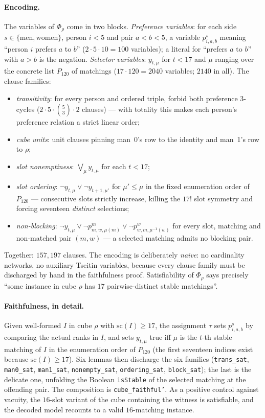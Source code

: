 \documentclass[11pt]{article}
\begin{document}
\paragraph{Encoding.} The variables of $\Phi_\rho$ come in two blocks. \emph{Preference
variables}: for each side $s\in\{\text{men},\text{women}\}$, person $i<5$ and pair
$a<b<5$, a variable $p^s_{i,a,b}$ meaning ``person $i$ prefers $a$ to $b$''
($2\cdot5\cdot10=100$ variables); a literal for ``prefers $a$ to $b$'' with $a>b$ is the
negation. \emph{Selector variables}: $y_{t,\mu}$ for $t<17$ and $\mu$ ranging over the
concrete list $P_{120}$ of matchings ($17\cdot120=2040$ variables; $2140$ in all). The
clause families:
\begin{itemize}
\item \emph{transitivity}: for every person and ordered triple, forbid both preference
  $3$-cycles ($2\cdot 5\cdot\binom{5}{3}\cdot 2$ clauses) --- with totality this makes each
  person's preference relation a strict linear order;
\item \emph{cube units}: unit clauses pinning man~0's row to the identity and man~1's row
  to $\rho$;
\item \emph{slot nonemptiness}: $\bigvee_\mu y_{t,\mu}$ for each $t<17$;
\item \emph{slot ordering}: $\neg y_{t,\mu} \vee \neg y_{t+1,\mu'}$ for $\mu' \le \mu$ in
  the fixed enumeration order of $P_{120}$ --- consecutive slots strictly increase, killing
  the $17!$ slot symmetry and forcing seventeen \emph{distinct} selections;
\item \emph{non-blocking}: $\neg y_{t,\mu} \vee \neg p^m_{m,w,\mu(m)} \vee
  \neg p^w_{w,m,\mu^{-1}(w)}$ for every slot, matching and non-matched pair $(m,w)$ ---
  a selected matching admits no blocking pair.
\end{itemize}
Together: $157{,}197$ clauses. The encoding is deliberately \emph{naive}: no cardinality
networks, no auxiliary Tseitin variables, because every clause family must be discharged by
hand in the faithfulness proof. Satisfiability of $\Phi_\rho$ says precisely ``some
instance in cube $\rho$ has $17$ pairwise-distinct stable matchings''.

\paragraph{Faithfulness, in detail.} Given well-formed $I$ in cube $\rho$ with
$\mathrm{sc}(I)\ge 17$, the assignment $\tau$ sets $p^s_{i,a,b}$ by comparing the actual
ranks in $I$, and sets $y_{t,\mu}$ true iff $\mu$ is the $t$-th stable matching of $I$ in
the enumeration order of $P_{120}$ (the first seventeen indices exist because
$\mathrm{sc}(I)\ge 17$). Six lemmas then discharge the six families
(\texttt{trans\_sat}, \texttt{man0\_sat}, \texttt{man1\_sat}, \texttt{nonempty\_sat},
\texttt{ordering\_sat}, \texttt{block\_sat}); the last is the delicate one, unfolding the
Boolean \texttt{isStable} of the selected matching at the offending pair. The composition
is \texttt{cube\_faithful'}. As a positive control against vacuity, the $16$-slot variant
of the cube containing the witness is satisfiable, and the decoded model recounts to a
valid $16$-matching instance.
\end{document}

